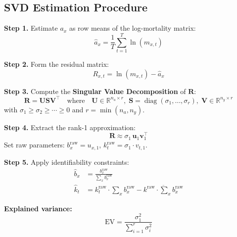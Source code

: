 \documentclass[11pt,a4paper]{article}
\theoremstyle{definition}
\newcommand{\R}{\mathbb{R}}
\begin{document}
\subsection{SVD Estimation Procedure}

\begin{formaldef}
\textbf{Step 1.} Estimate $a_x$ as row means of the log-mortality matrix:
\begin{equation}
  \hat{a}_x = \frac{1}{T} \sum_{t=1}^{T} \ln(m_{x,t})
  \label{eq:ax-estimate}
\end{equation}

\textbf{Step 2.} Form the residual matrix:
\begin{equation}
  R_{x,t} = \ln(m_{x,t}) - \hat{a}_x
  \label{eq:residual}
\end{equation}

\textbf{Step 3.} Compute the \textbf{Singular Value Decomposition} of $\bm{R}$:
\begin{equation}
  \bm{R} = \bm{U} \bm{S} \bm{V}^\top
  \quad\text{where}\quad
  \bm{U} \in \R^{n_a \times r}, \;
  \bm{S} = \operatorname{diag}(\sigma_1, \ldots, \sigma_r), \;
  \bm{V} \in \R^{n_y \times r}
  \label{eq:svd}
\end{equation}
with $\sigma_1 \geq \sigma_2 \geq \cdots \geq 0$ and $r = \min(n_a, n_y)$.

\textbf{Step 4.} Extract the rank-1 approximation:
\begin{equation}
  \bm{R} \approx \sigma_1 \, \bm{u}_1 \bm{v}_1^\top
\end{equation}
Set raw parameters: $b_x^{\text{raw}} = u_{x,1}$, \;
$k_t^{\text{raw}} = \sigma_1 \cdot v_{t,1}$.

\textbf{Step 5.} Apply identifiability constraints:
\begin{align}
  \hat{b}_x &= \frac{b_x^{\text{raw}}}{\sum_x b_x^{\text{raw}}}
  \label{eq:bx-constraint} \\
  \hat{k}_t &= k_t^{\text{raw}} \cdot \sum_x b_x^{\text{raw}}
  - \overline{k^{\text{raw}} \cdot \textstyle\sum_x b_x^{\text{raw}}}
  \label{eq:kt-constraint}
\end{align}

\textbf{Explained variance:}
\begin{equation}
  \text{EV} = \frac{\sigma_1^2}{\sum_{i=1}^{r} \sigma_i^2}
  \label{eq:explained-var}
\end{equation}
\end{formaldef}
\end{document}
